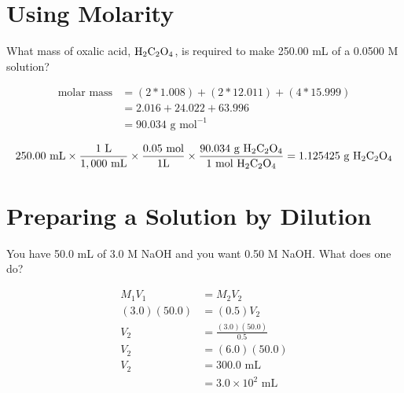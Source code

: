 \documentclass[
	chapter=4
]{chem122notes}
\begin{document}
\section{Using Molarity}\label{sec:using-molarity}
What mass of oxalic acid, $\chemical{H}[2]\chemical{C}[2]\chemical{O}[4]$, is required to make 250.00 mL of a 0.0500 M solution?

\begin{equation*}
\begin{aligned}
	\mbox{molar mass} &= (2*1.008) + (2*12.011) + (4 * 15.999)\\
			  &= 2.016 + 24.022 + 63.996\\
			  &= 90.034 \mbox{ g mol}^{-1}\\
\end{aligned}
\end{equation*}
\begin{equation*}
\begin{aligned}
	250.00 \mbox{ mL} \times \frac{1 \mbox{ L}}{1,000 \mbox{ mL}} \times \frac{0.05 \mbox{ mol}}{1 \mbox{L}} \times \frac{90.034 \mbox{ g }\chemical{H}[2]\chemical{C}[2]\chemical{O}[4]}{1 \mbox{ mol } \chemical{H}[2]\chemical{C}[2]\chemical{O}[4]} = 1.125425 \mbox{ g }\chemical{H}[2]\chemical{C}[2]\chemical{O}[4]\\
\end{aligned}
\end{equation*}

\section{Preparing a Solution by Dilution}\label{sec:preparing-a-solution-by-dilution}
You have 50.0 mL of 3.0 M NaOH and you want 0.50 M NaOH\@.
What does one do?

\begin{equation*}
\begin{aligned}
	M_{1}V_{1} &= M_{2}V_{2}\\
	(3.0)(50.0) &= (0.5)V_{2}\\
	V_{2} &= \frac{(3.0)(50.0)}{0.5}\\
	V_{2} &= (6.0)(50.0)\\
	V_{2} &= 300.0\mbox{ mL}\\
		  &= 3.0\times10^{2}\mbox{ mL}
\end{aligned}
\end{equation*}
\end{document}
